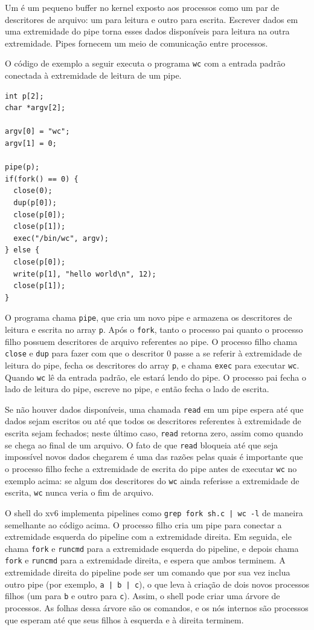 Um 
é um pequeno buffer no kernel exposto aos processos como um par de
descritores de arquivo: um para leitura e outro para escrita.
Escrever dados em uma extremidade do pipe
torna esses dados disponíveis para leitura na outra extremidade.
Pipes fornecem um meio de comunicação entre processos.

O código de exemplo a seguir executa o programa
\lstinline{wc}
com a entrada padrão conectada à extremidade de leitura de um pipe.
\begin{lstlisting}[]
int p[2];
char *argv[2];

argv[0] = "wc";
argv[1] = 0;

pipe(p);
if(fork() == 0) {
  close(0);
  dup(p[0]);
  close(p[0]);
  close(p[1]);
  exec("/bin/wc", argv);
} else {
  close(p[0]);
  write(p[1], "hello world\n", 12);
  close(p[1]);
}
\end{lstlisting}

O programa chama
\lstinline{pipe},
que cria um novo pipe e armazena os descritores de leitura e escrita
no array
\lstinline{p}.
Após o
\lstinline{fork},
tanto o processo pai quanto o processo filho possuem descritores de arquivo
referentes ao pipe.
O processo filho chama \lstinline{close} e \lstinline{dup} para fazer com que o descritor 0
passe a se referir à extremidade de leitura do pipe,
fecha os descritores do array
\lstinline{p},
e chama \lstinline{exec} para executar
\lstinline{wc}.
Quando
\lstinline{wc}
lê da entrada padrão, ele estará lendo do pipe.
O processo pai fecha o lado de leitura do pipe,
escreve no pipe,
e então fecha o lado de escrita.

Se não houver dados disponíveis, uma chamada
\lstinline{read}
em um pipe espera até que dados sejam escritos ou até que todos os
descritores referentes à extremidade de escrita sejam fechados;
neste último caso,
\lstinline{read}
retorna zero, assim como quando se chega ao final de um arquivo.
O fato de que
\lstinline{read}
bloqueia até que seja impossível novos dados chegarem
é uma das razões pelas quais é importante que o processo filho
feche a extremidade de escrita do pipe
antes de executar
\lstinline{wc}
no exemplo acima: se algum dos descritores do
\lstinline{wc}
ainda referisse a extremidade de escrita,
\lstinline{wc}
nunca veria o fim de arquivo.

O shell do xv6 implementa pipelines como
\lstinline{grep fork sh.c | wc -l}
de maneira semelhante ao código acima.
O processo filho cria um pipe para conectar a extremidade esquerda do pipeline
com a extremidade direita. Em seguida, ele chama
\lstinline{fork}
e
\lstinline{runcmd}
para a extremidade esquerda do pipeline,
e depois chama
\lstinline{fork}
e
\lstinline{runcmd}
para a extremidade direita, e espera que ambos terminem.
A extremidade direita do pipeline pode ser um comando que por sua vez inclua outro
pipe (por exemplo,
\lstinline{a | b | c}),
o que leva à criação de dois novos processos filhos (um para
\lstinline{b}
e outro para
\lstinline{c}).
Assim, o shell pode criar uma árvore de processos. As folhas dessa árvore são os comandos,
e os nós internos são processos que esperam até que seus filhos à esquerda e à direita terminem.


